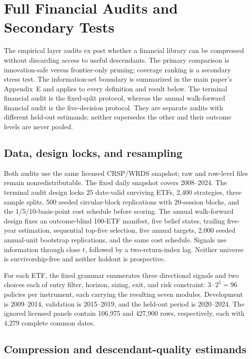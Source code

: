 \section{Full Financial Audits and Secondary Tests}
\label{sec:supp-financial-audit}

The empirical layer audits ex post whether a financial library can be
compressed without discarding access to useful descendants.  The primary
comparison is innovation-safe versus frontier-only pruning; coverage ranking
is a secondary stress test.  The information-set boundary is summarized in
the main paper's Appendix~E and applies to every definition and result below.
The terminal financial audit is the fixed-split protocol, whereas the annual
walk-forward financial audit is the five-decision protocol.  They are separate
audits with different held-out estimands; neither supersedes the other and
their outcome levels are never pooled.

\subsection{Data, design locks, and resampling}

Both audits use the same licensed CRSP/WRDS snapshot; raw and row-level files
remain nonredistributable.  The fixed daily snapshot covers 2008--2024.  The
terminal audit design locks 25 date-valid surviving ETFs, 2,400 strategies, three
sample splits, 500 seeded circular-block replications with 20-session blocks,
and the 1/5/10-basis-point cost schedule before scoring.  The annual
walk-forward design fixes an outcome-blind 100-ETF manifest, five belief
states, trailing five-year estimation, sequential top-five selection, five
annual targets, 2,000 seeded annual-unit bootstrap replications, and the same
cost schedule.  Signals use information through close \(t\), followed by a
two-return-index lag.  Neither universe is survivorship-free and neither
holdout is prospective.

For each ETF, the fixed grammar enumerates three directional signals and two
choices each of entry filter, horizon, sizing, exit, and risk constraint:
\(3\cdot2^5=96\) policies per instrument, each carrying the resulting seven
modules.  Development is 2009--2014, validation is 2015--2019, and the
held-out period is 2020--2024.  The ignored licensed panels contain 106,975
and 427,900 rows, respectively, each with 4,279 complete common dates.

\subsection{Compression and descendant-quality estimands}
\label{sec:supp-financial-estimands}

